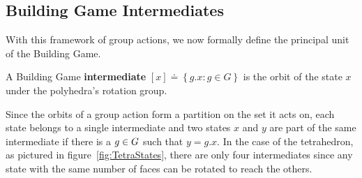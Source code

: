 \subsection{Building Game Intermediates}

With this framework of group actions, we now formally define the principal unit of the Building Game. 
\begin{mydef}
A Building Game \textbf{intermediate} $[x] \doteq \left\{g.x : g \in G\right\}$ is the orbit of the state $x$ under the polyhedra's rotation group. 
\end{mydef}
Since the orbits of a group action form a partition on the set it acts on, each state belongs to a single intermediate and two states $x$ and $y$ are part of the same intermediate if there is a $g\in{G}$ such that $y = g.x$. In the case of the tetrahedron, as pictured in figure~\ref{fig:TetraStates}, there are only four intermediates since any state with the same number of faces can be rotated to reach the others. 


